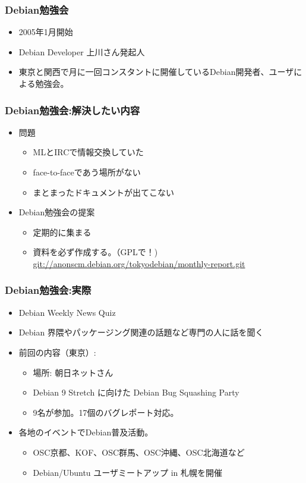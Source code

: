\begin{frame}
\frametitle{Debian勉強会}
\begin{itemize}
 \item 2005年1月開始
 \item Debian Developer 上川さん発起人
\item 東京と関西で月に一回コンスタントに開催しているDebian開発者、ユーザによる勉強会。
\end{itemize}
\end{frame}

\begin{frame}

\frametitle{Debian勉強会:解決したい内容}
\begin{itemize}
 \item<1-> 問題
       \begin{itemize}
	\item MLとIRCで情報交換していた
	\item face-to-faceであう場所がない
	\item まとまったドキュメントが出てこない
       \end{itemize}
 \item<2-> Debian勉強会の提案
       \begin{itemize}
	\item 定期的に集まる
	\item 資料を必ず作成する。（GPLで！) \\
	  {\small \url{git://anonscm.debian.org/tokyodebian/monthly-report.git}}
       \end{itemize}
\end{itemize}

\end{frame}

\begin{frame}
 \frametitle{Debian勉強会:実際}
 \begin{itemize}
  \item Debian Weekly News Quiz
  \item Debian 界隈やパッケージング関連の話題など専門の人に話を聞く
  \item 前回の内容（東京）:\\
	\begin{itemize}
	\item 場所: 朝日ネットさん
	\item Debian 9 Stretch に向けた Debian Bug Squashing Party
        \item 9名が参加。17個のバグレポート対応。
	\end{itemize}
  \item 各地のイベントでDebian普及活動。 
	\begin{itemize}
	  \item OSC京都、KOF、OSC群馬、OSC沖縄、OSC北海道など
	  \item Debian/Ubuntu ユーザミートアップ in 札幌を開催
	\end{itemize}
 \end{itemize}
\end{frame}


